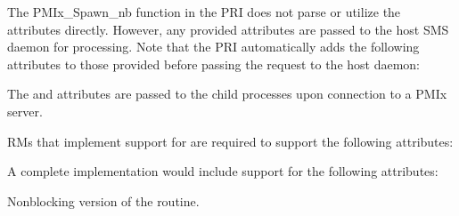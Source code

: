 \priattr
The PMIx_Spawn_nb function in the \ac{PRI} does not parse or utilize the attributes directly. However, any provided attributes are passed to the host \ac{SMS} daemon for processing. Note that the \ac{PRI} automatically adds the following attributes to those provided before passing the request to the host daemon:


The  and  attributes are passed to the child processes upon connection to a PMIx server.

\reqattr
\acp{RM} that implement support for  are required to support the following attributes:


\optattr
A complete implementation would include support for the following attributes:


\descr

Nonblocking version of the  routine.


